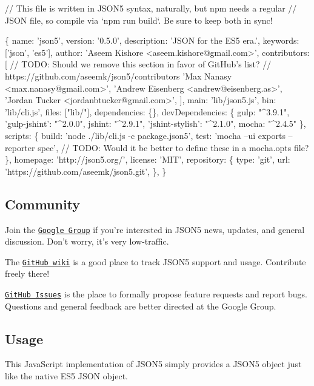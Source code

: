 \begin{DoxyCode}
// This file is written in JSON5 syntax, naturally, but npm needs a regular
// JSON file, so compile via `npm run build`. Be sure to keep both in sync!

\{
    name: 'json5',
    version: '0.5.0',
    description: 'JSON for the ES5 era.',
    keywords: ['json', 'es5'],
    author: 'Aseem Kishore <aseem.kishore@gmail.com>',
    contributors: [
        // TODO: Should we remove this section in favor of GitHub's list?
        // https://github.com/aseemk/json5/contributors
        'Max Nanasy <max.nanasy@gmail.com>',
        'Andrew Eisenberg <andrew@eisenberg.as>',
        'Jordan Tucker <jordanbtucker@gmail.com>',
    ],
    main: 'lib/json5.js',
    bin: 'lib/cli.js',
    files: ["lib/"],
    dependencies: \{\},
    devDependencies: \{
        gulp: "^3.9.1",
        'gulp-jshint': "^2.0.0",
        jshint: "^2.9.1",
        'jshint-stylish': "^2.1.0",
        mocha: "^2.4.5"
    \},
    scripts: \{
        build: 'node ./lib/cli.js -c package.json5',
        test: 'mocha --ui exports --reporter spec',
            // TODO: Would it be better to define these in a mocha.opts file?
    \},
    homepage: 'http://json5.org/',
    license: 'MIT',
    repository: \{
        type: 'git',
        url: 'https://github.com/aseemk/json5.git',
    \},
\}
\end{DoxyCode}


\subsection*{Community}

Join the \href{http://groups.google.com/group/json5}{\tt Google Group} if you’re interested in J\+S\+O\+N5 news, updates, and general discussion. Don’t worry, it’s very low-\/traffic.

The \href{https://github.com/aseemk/json5/wiki}{\tt Git\+Hub wiki} is a good place to track J\+S\+O\+N5 support and usage. Contribute freely there!

\href{https://github.com/aseemk/json5/issues}{\tt Git\+Hub Issues} is the place to formally propose feature requests and report bugs. Questions and general feedback are better directed at the Google Group.

\subsection*{Usage}

This Java\+Script implementation of J\+S\+O\+N5 simply provides a {\ttfamily J\+S\+O\+N5} object just like the native E\+S5 {\ttfamily J\+S\+ON} object.

